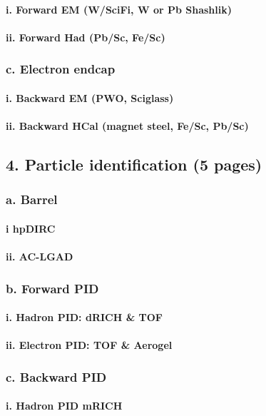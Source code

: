 \documentclass{report}
\begin{document}
\paragraph{i. Forward EM (W/SciFi, W or Pb Shashlik)}
\paragraph{ii. Forward Had (Pb/Sc, Fe/Sc)}
\subsubsection{c. Electron endcap}
\paragraph{i. Backward EM (PWO, Sciglass)}
\paragraph{ii. Backward HCal (magnet steel, Fe/Sc, Pb/Sc)}
\subsection{4. Particle identification (5 pages)}
\subsubsection{a. Barrel}
\paragraph{i hpDIRC}
\paragraph{ii. AC-LGAD}
\subsubsection{b. Forward PID}
\paragraph{i. Hadron PID: dRICH & TOF}
\paragraph{ii. Electron PID: TOF \& Aerogel}
\subsubsection{c. Backward PID}
\paragraph{i. Hadron PID mRICH}
\end{document}
